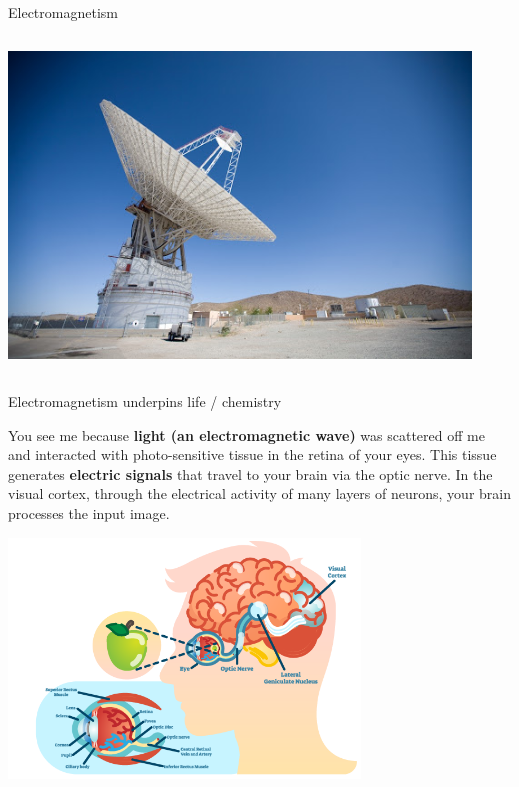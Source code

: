\begin{frame}{Electromagnetism}
\begin{columns}
\begin{column}{0.30\textwidth}
\begin{center}
          \includegraphics[width=0.92\textwidth]{./images/misc/radio_telescope_1.jpg}\\
        \end{center}
      \end{column}
\end{columns}

\end{frame}

%
%
%

\begin{frame}{Electromagnetism underpins life / chemistry}

  {\scriptsize
   You see me because {\bf light (an electromagnetic wave)} was scattered off me
   and interacted with photo-sensitive tissue in the retina of your eyes.
   This tissue generates {\bf electric signals} that travel to your
   brain via the optic nerve.
   In the visual cortex, through the electrical activity of many layers of neurons,
   your brain processes the input image.
  }

   \begin{center}
     \includegraphics[width=0.70\textwidth]{./images/misc/vision_2.png}\\
   \end{center}

\end{frame}


